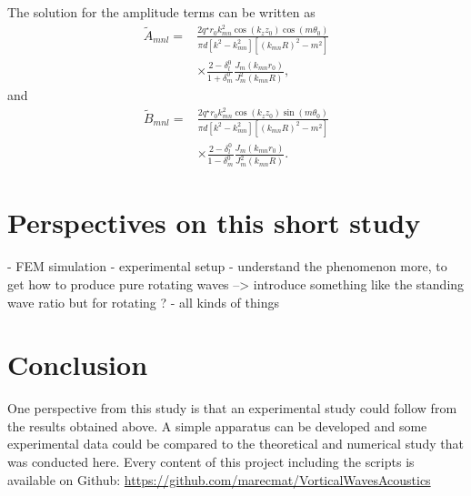 \documentclass[%
 reprint,
 amsmath,amssymb,
 aip,
]{revtex4-1}
\begin{document}
The solution for the amplitude terms can be written as 
\begin{equation}
    \begin{split}
        \tilde{A}_{mnl} = &\frac{2 q^{\star} r_0 k^2_{mn} \cos(k_z z_0) \cos(m \theta_0)}{\pi d\left[k^2 - k^2_{mn}\right] \left[(k_{mn}R)^2 - m^2 \right]}\\  &\times \frac{2 - \delta_l^0}{1 + \delta_m^0} \frac{J_m(k_{mn}r_0)}{J^2_{m}(k_{mn}R)},
    \end{split}
\end{equation}
and
\begin{equation}
    \begin{split}
        \tilde{B}_{mnl} = &\frac{2 q^{\star} r_0 k^2_{mn} \cos(k_z z_0) \sin(m \theta_0)}{\pi d\left[k^2 - k^2_{mn}\right] \left[(k_{mn}R)^2 - m^2 \right]}\\  &\times \frac{2 - \delta_l^0}{1 - \delta_m^0} \frac{J_m(k_{mn}r_0)}{J^2_{m}(k_{mn}R)}.
    \end{split}
\end{equation}

\section{Perspectives on this short study}
- FEM simulation
- experimental setup
- understand the phenomenon more, to get how to produce pure rotating waves --> introduce something like the standing wave ratio but for rotating ?
- all kinds of things

\section{Conclusion}
One perspective from this study is that an experimental study could follow from the results obtained above. A simple apparatus can be developed and some experimental data could be compared to the theoretical and numerical study that was conducted here. Every content of this project including the scripts is available on Github: \url{https://github.com/marecmat/VorticalWavesAcoustics}


\end{document}
